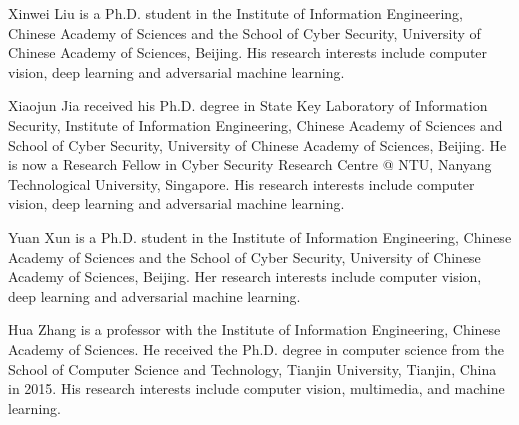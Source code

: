 \begin{IEEEbiography}
{Xinwei Liu} 
is a Ph.D. student in the Institute of Information Engineering, Chinese Academy of Sciences and the School of Cyber Security, University of Chinese Academy of Sciences, Beijing. His research interests include computer vision, deep learning and adversarial machine learning.
\end{IEEEbiography}


\begin{IEEEbiography}
{Xiaojun Jia} 
received his Ph.D. degree in  State Key Laboratory of Information Security, Institute
of Information Engineering, Chinese Academy of Sciences and School of
Cyber Security, University of Chinese Academy of Sciences, Beijing. He is now a Research Fellow in Cyber Security Research Centre @ NTU, Nanyang Technological University, Singapore. His research interests include computer vision, deep learning and adversarial machine learning.
\end{IEEEbiography}

\begin{IEEEbiography}
{Yuan Xun} 
is a Ph.D. student in the Institute of Information Engineering, Chinese Academy of Sciences and the School of Cyber Security, University of Chinese Academy of Sciences, Beijing. Her research interests include computer vision, deep learning and adversarial machine learning.
\end{IEEEbiography}



\begin{IEEEbiography}{Hua Zhang} is a professor with the Institute of Information Engineering, Chinese Academy of Sciences. He received the Ph.D. degree in computer science from the School of Computer Science and Technology, Tianjin University, Tianjin, China in 2015. His research interests include computer vision, multimedia, and machine learning.
\end{IEEEbiography}



